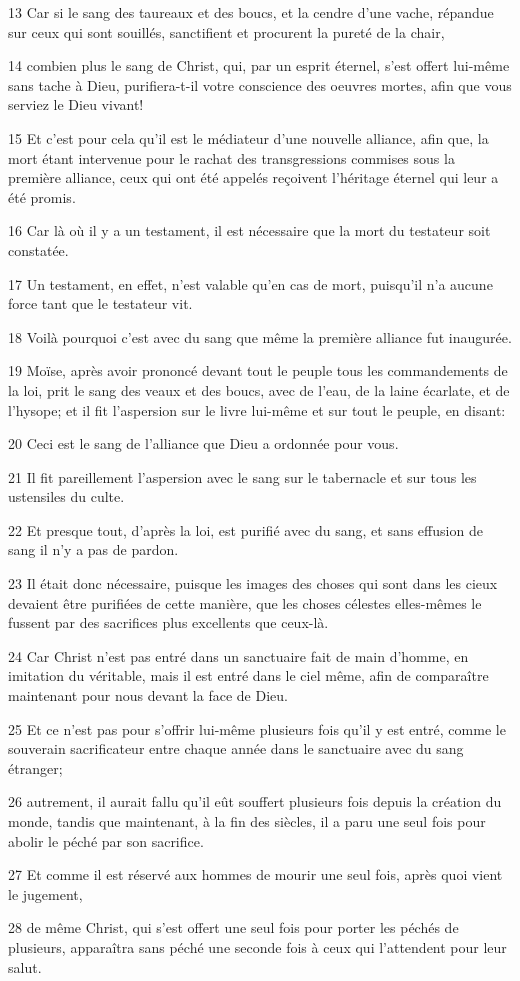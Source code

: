 \par 13 Car si le sang des taureaux et des boucs, et la cendre d'une vache, répandue sur ceux qui sont souillés, sanctifient et procurent la pureté de la chair,
\par 14 combien plus le sang de Christ, qui, par un esprit éternel, s'est offert lui-même sans tache à Dieu, purifiera-t-il votre conscience des oeuvres mortes, afin que vous serviez le Dieu vivant!
\par 15 Et c'est pour cela qu'il est le médiateur d'une nouvelle alliance, afin que, la mort étant intervenue pour le rachat des transgressions commises sous la première alliance, ceux qui ont été appelés reçoivent l'héritage éternel qui leur a été promis.
\par 16 Car là où il y a un testament, il est nécessaire que la mort du testateur soit constatée.
\par 17 Un testament, en effet, n'est valable qu'en cas de mort, puisqu'il n'a aucune force tant que le testateur vit.
\par 18 Voilà pourquoi c'est avec du sang que même la première alliance fut inaugurée.
\par 19 Moïse, après avoir prononcé devant tout le peuple tous les commandements de la loi, prit le sang des veaux et des boucs, avec de l'eau, de la laine écarlate, et de l'hysope; et il fit l'aspersion sur le livre lui-même et sur tout le peuple, en disant:
\par 20 Ceci est le sang de l'alliance que Dieu a ordonnée pour vous.
\par 21 Il fit pareillement l'aspersion avec le sang sur le tabernacle et sur tous les ustensiles du culte.
\par 22 Et presque tout, d'après la loi, est purifié avec du sang, et sans effusion de sang il n'y a pas de pardon.
\par 23 Il était donc nécessaire, puisque les images des choses qui sont dans les cieux devaient être purifiées de cette manière, que les choses célestes elles-mêmes le fussent par des sacrifices plus excellents que ceux-là.
\par 24 Car Christ n'est pas entré dans un sanctuaire fait de main d'homme, en imitation du véritable, mais il est entré dans le ciel même, afin de comparaître maintenant pour nous devant la face de Dieu.
\par 25 Et ce n'est pas pour s'offrir lui-même plusieurs fois qu'il y est entré, comme le souverain sacrificateur entre chaque année dans le sanctuaire avec du sang étranger;
\par 26 autrement, il aurait fallu qu'il eût souffert plusieurs fois depuis la création du monde, tandis que maintenant, à la fin des siècles, il a paru une seul fois pour abolir le péché par son sacrifice.
\par 27 Et comme il est réservé aux hommes de mourir une seul fois, après quoi vient le jugement,
\par 28 de même Christ, qui s'est offert une seul fois pour porter les péchés de plusieurs, apparaîtra sans péché une seconde fois à ceux qui l'attendent pour leur salut.

